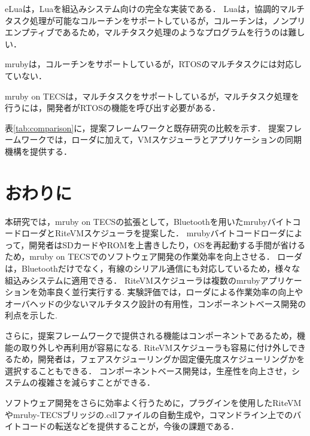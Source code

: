 \documentclass[submit,techrep]{ipsj}
\begin{document}
eLuaは，Luaを組込みシステム向けの完全な実装である．
Luaは，協調的マルチタスク処理が可能なコルーチンをサポートしているが，コルーチンは，ノンプリエンプティブであるため，マルチタスク処理のようなプログラムを行うのは難しい．

mrubyは，コルーチンをサポートしているが，RTOSのマルチタスクには対応していない．

mruby on TECSは，マルチタスクをサポートしているが，マルチタスク処理を行うには，開発者がRTOSの機能を呼び出す必要がある．

表\ref{tab:comparison}に，提案フレームワークと既存研究の比較を示す．
提案フレームワークでは，ローダに加えて，VMスケジューラとアプリケーションの同期機構を提供する．

\section{おわりに}
\label{sec:Conclusion}
本研究では，mruby on TECSの拡張として，Bluetoothを用いたmrubyバイトコードローダとRiteVMスケジューラを提案した．
mrubyバイトコードローダによって，開発者はSDカードやROMを上書きしたり，OSを再起動する手間が省けるため，mruby on TECSでのソフトウェア開発の作業効率を向上させる．
ローダは，Bluetoothだけでなく，有線のシリアル通信にも対応しているため，様々な組込みシステムに適用できる．
RiteVMスケジューラは複数のmrubyアプリケーションを効率良く並行実行する.
実験評価では，ローダによる作業効率の向上やオーバヘッドの少ないマルチタスク設計の有用性，コンポーネントベース開発の利点を示した.

さらに，提案フレームワークで提供される機能はコンポーネントであるため，機能の取り外しや再利用が容易になる.
RiteVMスケジューラも容易に付け外しできるため，開発者は，フェアスケジューリングか固定優先度スケジューリングかを選択することもできる．
コンポーネントベース開発は，生産性を向上させ，システムの複雑さを減らすことができる．

ソフトウェア開発をさらに効率よく行うために，プラグインを使用したRiteVMやmruby-TECSブリッジの.cdlファイルの自動生成や，コマンドライン上でのバイトコードの転送などを提供することが，今後の課題である．



\end{document}
